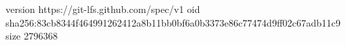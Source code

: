 version https://git-lfs.github.com/spec/v1
oid sha256:83cb8344f464991262412a8b11bb0bf6a0b3373e86c77474d9ff02c67adb11c9
size 2796368
